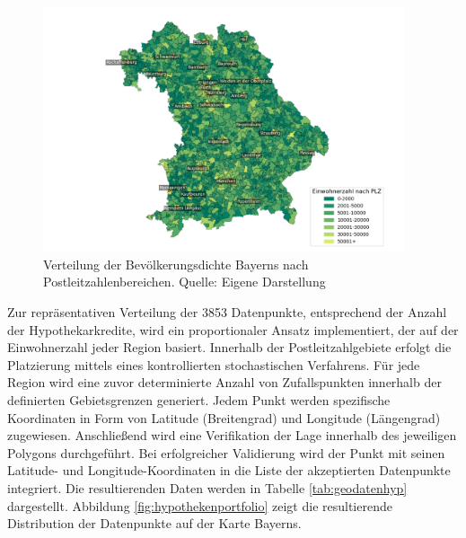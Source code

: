 \begin{figure}[htbp]
    \centering
    \includegraphics[width=0.95\textwidth]{figures/Bayern_pop_plz.png}
    \caption{Verteilung der Bevölkerungsdichte Bayerns nach Postleitzahlenbereichen. Quelle: Eigene Darstellung}
    \label{fig:bevoelkerungsdichte}
\end{figure}
\FloatBarrier

Zur repräsentativen Verteilung der 3853 Datenpunkte, entsprechend der Anzahl der Hypothekarkredite, wird ein proportionaler Ansatz implementiert, der auf der Einwohnerzahl jeder Region basiert. Innerhalb der Postleitzahlgebiete erfolgt die Platzierung mittels eines kontrollierten stochastischen Verfahrens. Für jede Region wird eine zuvor determinierte Anzahl von Zufallspunkten innerhalb der definierten Gebietsgrenzen generiert. Jedem Punkt werden spezifische Koordinaten in Form von Latitude (Breitengrad) und Longitude (Längengrad) zugewiesen. Anschließend wird eine Verifikation der Lage innerhalb des jeweiligen Polygons durchgeführt. Bei erfolgreicher Validierung wird der Punkt mit seinen Latitude- und Longitude-Koordinaten in die Liste der akzeptierten Datenpunkte integriert. Die resultierenden Daten werden in Tabelle \ref{tab:geodatenhyp} dargestellt. Abbildung \ref{fig:hypothekenportfolio} zeigt die resultierende Distribution der Datenpunkte auf der Karte Bayerns.

